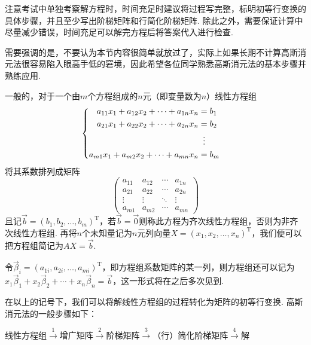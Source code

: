 注意考试中单独考察解方程时，时间充足时建议将过程写完整，标明初等行变换的具体步骤，并且至少写出阶梯矩阵和行简化阶梯矩阵. 除此之外，需要保证计算中尽量减少错误，时间充足可以解完方程后将答案代入进行检查.

需要强调的是，不要认为本节内容很简单就放过了，实际上如果长期不计算高斯消元法很容易陷入眼高手低的窘境，因此希望各位同学熟悉高斯消元法的基本步骤并熟练应用.

一般的，对于一个由$m$个方程组成的$n$元（即变量数为$n$）线性方程组
\[ \begin{cases} \begin{aligned}
            a_{11}x_1+a_{12}x_2+\cdots+a_{1n}x_n & = b_1           \\
            a_{21}x_1+a_{22}x_2+\cdots+a_{2n}x_n & = b_2           \\
                                                 & \vdotswithin{=} \\
            a_{m1}x_1+a_{m2}x_2+\cdots+a_{mn}x_n & = b_m
        \end{aligned} \end{cases} \]
将其系数排列成矩阵
\[\begin{pmatrix}
        a_{11} & a_{12} & \cdots & a_{1n} \\
        a_{21} & a_{22} & \cdots & a_{2n} \\
        \vdots & \vdots & \ddots & \vdots \\
        a_{m1} & a_{m2} & \cdots & a_{mn}
    \end{pmatrix}\]
且记$\vec{b}=(b_1,b_2,\ldots,b_m)^\mathrm{T}$，若$\vec{b}=\vec{0}$则称此方程为齐次线性方程组，否则为非齐次线性方程组. 再将$n$个未知量记为$n$元列向量$X=(x_1,x_2,\ldots,x_n)^\mathrm{T}$，我们便可以把方程组简记为$AX=\vec{b}$.

令$\vec{\beta}_i=(a_{1i},a_{2i},\ldots,a_{mi})^\mathrm{T}$，即方程组系数矩阵的某一列，则方程组还可以记为$x_1\vec{\beta}_1+x_2\vec{\beta}_2+\cdots+x_n\vec{\beta}_n=\vec{b}$，这一形式将在之后多次见到.

在以上的记号下，我们可以将解线性方程组的过程转化为矩阵的初等行变换. 高斯消元法的一般步骤如下：
\begin{center}
    线性方程组$\overset{1}{\longrightarrow}$增广矩阵$\overset{2}{\longrightarrow}$阶梯矩阵$\overset{3}{\longrightarrow}$（行）简化阶梯矩阵$\overset{4}{\longrightarrow}$解
\end{center}

